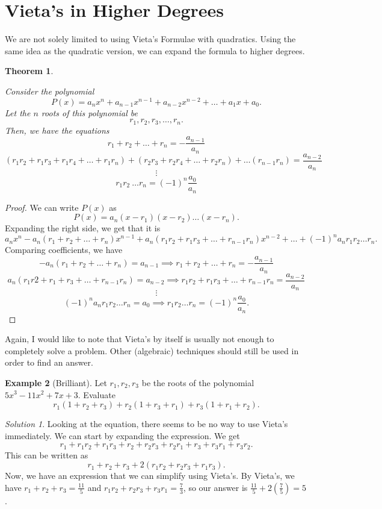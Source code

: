 \documentclass[l1pt]{article}
\theoremstyle{plain}
\newtheorem{thm}{Theorem}[section]
\theoremstyle{definition}
\newtheorem{example}[thm]{Example}
\theoremstyle{remark}
\newtheorem*{solution}{Solution}
\begin{document}
\section{Vieta's in Higher Degrees}

We are not solely limited to using Vieta's Formulae with quadratics. Using the same idea as the quadratic version, we can expand the formula to higher degrees.

\begin{thm}
\begin{mdframed}
Consider the polynomial \[P(x)=a_nx^n+a_{n-1}x^{n-1}+a_{n-2}x^{n-2}+\dots+a_1x+a_0.\] Let the $n$ roots of this polynomial be \[r_1, r_2, r_3, \dots, r_n.\] Then, we have the equations 
\[r_1+r_2+\dots+r_n=-\frac{a_{n-1}}{a_n}\] 
\[(r_1r_2+r_1r_3+r_1r_4+\dots+r_1r_n)+(r_2r_3+r_2r_4+\dots+r_2r_n)+\dots(r_{n-1}r_n)=\frac{a_{n-2}}{a_n}\] \[\vdots\] \[r_1r_2\ \dots r_n=(-1)^n\frac{a_0}{a_n}\] 

\end{mdframed}
\end{thm}

\begin{proof}
We can write $P(x)$ as \[P(x)=a_n(x-r_1)(x-r_2)\dots(x-r_n).\] Expanding the right side, we get that it is 
\[a_nx^n-a_n(r_1+r_2+\dots+r_n)x^{n-1}+a_n(r_1r_2+r_1r_3+\dots+r_{n-1}r_n)x^{n-2}+\dots+(-1)^na_nr_1r_2\dots r_n.\] Comparing coefficients, we have 
\[-a_n(r_1+r_2+\dots+r_n)=a_{n-1} \implies r_1+r_2+\dots+r_n=-\frac{a_{n-1}}{a_n}\]
\[a_n(r_1r2+r_1+r_3+\dots+r_{n-1}r_n)=a_{n-2} \implies r_1r_2+r_1r_3+\dots+r_{n-1}r_n=\frac{a_{n-2}}{a_n}\]
\[\vdots\]
\[(-1)^na_nr_1r_2\dots r_n=a_0 \implies r_1r_2\dots r_n=(-1)^n\frac{a_0}{a_n}.\]
\end{proof}

Again, I would like to note that Vieta's by itself is usually not enough to completely solve a problem. Other (algebraic) techniques should still be used in order to find an answer.

\begin{example}[Brilliant]
Let $r_1, r_2, r_3$ be the roots of the polynomial $5x^3-11x^2+7x+3.$ Evaluate 
\[r_1(1+r_2+r_3)+r_2(1+r_3+r_1)+r_3(1+r_1+r_2).\]
\end{example}

\begin{solution}
Looking at the equation, there seems to be no way to use Vieta's immediately. We can start by expanding the expression. We get \[r_1+r_1r_2+r_1r_3+r_2+r_2r_3+r_2r_1+r_3+r_3r_1+r_3r_2.\] This can be written as \[r_1+r_2+r_3+2(r_1r_2+r_2r_3+r_1r_3).\] Now, we have an expression that we can simplify using Vieta's. By Vieta's, we have $r_1+r_2+r_3=\frac{11}{5}$ and $r_1r_2+r_2r_3+r_3r_1=\frac{7}{3}$, so our answer is $\frac{11}{5}+2(\frac{7}{5})=5$.
 \end{solution}
 
\end{document}
